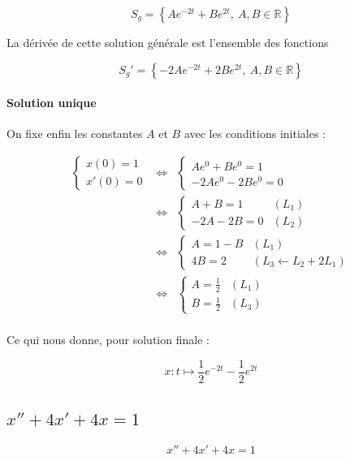 \documentclass[a4paper, 11pt]{report} %
\newcommand{\R}{\mathbb{R}}
\renewcommand{\mapsto}{\longmapsto}
\begin{document}
\[
S_g = \left\{Ae^{-2t} + Be^{2t},~A,B\in\R\right\}
\]

La dérivée de cette solution générale est l'ensemble des fonctions

\[
S_g' = \left\{-2Ae^{-2t} + 2Be^{2t},~A,B\in\R\right\}
\]

\paragraph{Solution unique}
On fixe enfin les constantes $A$ et $B$ avec les conditions initiales :

\begin{eqnarray*}
\left\{\begin{array}{l}
x(0) = 1\\
x'(0) = 0
\end{array}\right. & \Leftrightarrow &
\left\{\begin{array}{l}
Ae^0 + Be^0 = 1\\
-2Ae^0 - 2Be^0 = 0
\end{array}\right.\\
& \Leftrightarrow &                     %
\left\{\begin{array}{ll}
A + B = 1 & (L_1)\\
-2A - 2B = 0 & (L_2)
\end{array}\right.\\
& \Leftrightarrow &                     %
\left\{\begin{array}{ll}
A = 1 - B & (L_1)\\
4B = 2 & (L_3 \leftarrow L_2 + 2L_1)
\end{array}\right.\\
& \Leftrightarrow &                     %
\left\{\begin{array}{ll}
A = \frac{1}{2} & (L_1)\\
B = \frac{1}{2} & (L_3)
\end{array}\right.\\
\end{eqnarray*}

Ce qui nous donne, pour solution finale :

\[
x : t \mapsto \frac{1}{2}e^{-2t} - \frac{1}{2}e^{2t}
\]
\subsection{$x'' + 4x' + 4x = 1$} %

\begin{equation}
x'' + 4x' + 4x = 1
\label{equa_diff_3}
\end{equation}
\end{document}
